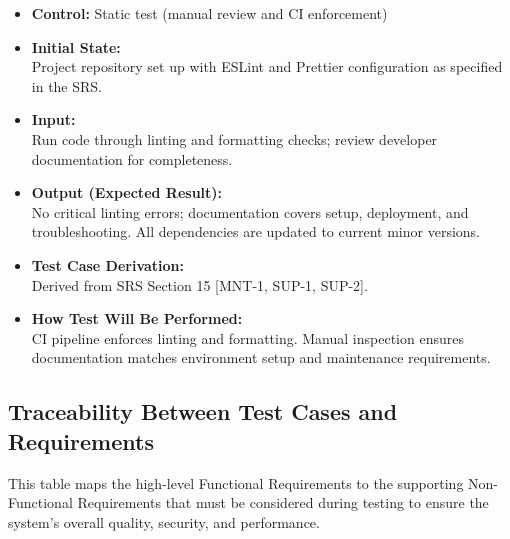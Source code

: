 \documentclass[12pt, titlepage]{article}
\begin{document}
\begin{itemize}
    \item \textbf{Control:} Static test (manual review and CI enforcement)
    \item \textbf{Initial State:} \\
    Project repository set up with ESLint and Prettier configuration as specified in the SRS.
    \item \textbf{Input:} \\
    Run code through linting and formatting checks; review developer documentation for completeness.
    \item \textbf{Output (Expected Result):} \\
    No critical linting errors; documentation covers setup, deployment, and troubleshooting. All dependencies are updated to current minor versions.
    \item \textbf{Test Case Derivation:} \\
    Derived from SRS Section 15 [MNT-1, SUP-1, SUP-2].
    \item \textbf{How Test Will Be Performed:} \\
    CI pipeline enforces linting and formatting. Manual inspection ensures documentation matches environment setup and maintenance requirements.
\end{itemize}


\subsection{Traceability Between Test Cases and Requirements}


  This table maps the high-level Functional Requirements to the supporting Non-Functional Requirements that must be considered during testing to ensure the system's overall quality, security, and performance.

\vspace{0.5cm}
\end{document}
